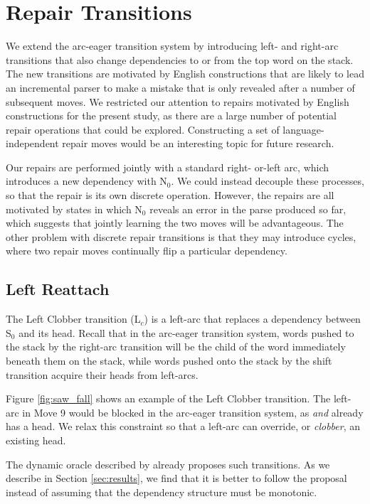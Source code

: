 \documentclass[11pt,letterpaper]{article}
\newcommand{\stacktop}{S$_0$\xspace}
\newcommand{\buffone}{N$_0$\xspace}
\begin{document}
\clearpage

\section{Repair Transitions}

We extend the arc-eager transition system by introducing left- and right-arc
transitions that also change dependencies to or from the top word on the
stack. The new transitions are motivated by English constructions that are likely
to lead an incremental parser to make a mistake that is only revealed after a number
of subsequent moves. We restricted our attention to repairs motivated by English
constructions for the present study, as there are a large number of potential
repair operations that could be explored. Constructing a set of language-independent
repair moves would be an interesting topic for future research.

Our repairs are performed jointly with a standard right- or-left arc, which introduces
a new dependency with \buffone.
We could instead decouple these processes, so that the repair is its own
discrete operation. However, the repairs are all motivated by states in which
\buffone reveals an error in the parse produced so far, which suggests
that jointly learning the two moves will be advantageous. The other problem with
discrete repair transitions is that they may introduce cycles, where two
repair moves continually flip a particular dependency.

\subsection{Left Reattach}

The Left Clobber transition (L$_c$) is a left-arc that replaces a dependency between
\stacktop and its head. Recall that in the arc-eager transition system, words
pushed to the stack by the right-arc transition will be the child of the word
immediately beneath them on the stack, while words pushed onto the stack by the
shift transition acquire their heads from left-arcs.

Figure \ref{fig:saw_fall} shows an example of the Left Clobber transition. The
left-arc in Move 9 would be blocked in the arc-eager transition system, as
\emph{and} already has a head. We relax this constraint so that a left-arc can
override, or \emph{clobber}, an existing head.

The dynamic oracle described by \citet{goldberg:12} already proposes such transitions.
As we describe in Section \ref{sec:results}, we find that it is better to follow
the proposal instead of assuming that the dependency
structure must be monotonic.
\end{document}

